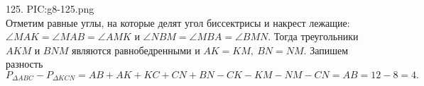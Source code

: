 125. {{PIC:g8-125.png}}\\
Отметим равные углы, на которые делят угол биссектрисы и накрест лежащие: $\angle MAK=\angle MAB=\angle AMK$ и $\angle NBM=\angle MBA=\angle BMN.$ Тогда треугольники $AKM$ и $BNM$ являются равнобедренными и $AK=KM,\ BN=NM.$ Запишем разность $P_{\Delta ABC}-P_{\Delta KCN}=AB+AK+KC+CN+BN-CK-KM-NM-CN=AB=12-8=4.$\\
